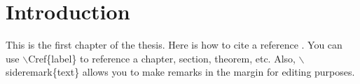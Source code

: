 
\chapter{Introduction} \label{label}

This is the first chapter of the thesis. Here is how to cite a reference \cite{thissen}. You can use $\backslash$Cref\{label\}  to reference a chapter, section, theorem, etc. Also, $\backslash$sideremark\{text\}  allows you to make remarks in the margin for editing purposes. 
